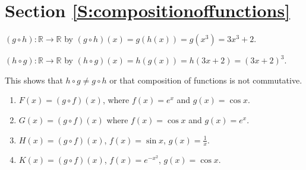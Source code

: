\section*{Section \ref{S:compositionoffunctions}}

\begin{list}{\bf{\ref{exer64:notcommutative}.}}
\item $( {g \circ h} ):\mathbb{R} \to \mathbb{R}$  by  
$( {g \circ h} )( x ) = g( {h( x )} ) = g\!\left( {x^3 } \right) = 3x^3  + 2$.

$( {h \circ g} ):\mathbb{R} \to \mathbb{R}$  by  
$( {h \circ g} )( x ) = h( {g( x )} ) = h( {3x + 2} ) = ( {3x + 2} )^3 $.

\noindent
This shows that $h \circ g \ne g \circ h$ or that composition of functions is not commutative.
\end{list}


\begin{list}{\bf{\ref{exer:sec64-2}.}}
\item \begin{enumerate}
\item $F\left( x \right) = \left( {g \circ f} \right)\left( x \right)$, where 
$f\left( x \right) = e^x$  and $g\left( x \right) = \cos x$.

\item $G\left( x \right) = \left( {g \circ f} \right)\left( x \right)$ where 
$f\left( x \right) = \cos x$ and $g\left( x \right) = e^x $.

\item $H\left( x \right) = \left( {g \circ f} \right)\left( x \right)$, 
$f\left( x \right) = \sin x$, $g\left( x \right) = \frac{1}{x}$.

\item $K\left( x \right) = \left( {g \circ f} \right)\left( x \right)$, 
$f\left( x \right) = e^{-x^2}$, $g\left( x \right) = \cos x$.
\end{enumerate}
%
\end{list}


